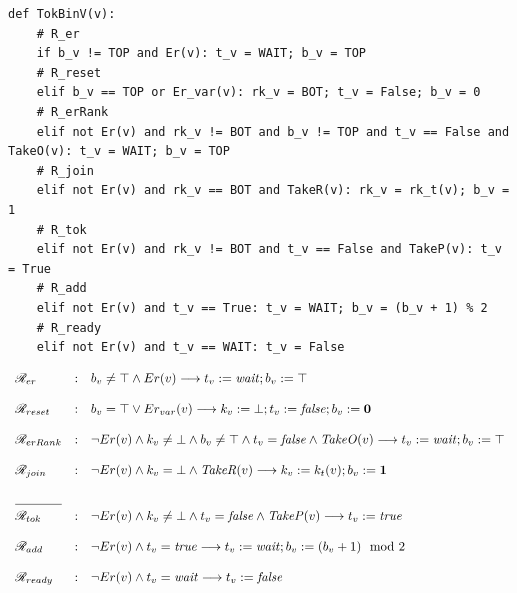 \documentclass[a4paper, 12pt]{article}
\newcommand{\bz}{\mathbf{0}}
\newcommand{\bo}{\mathbf{1}}
\newcommand{\rk}{k}
\begin{document}
\begin{lstlisting}[caption={\(\mathtt{TokBinV}\) (node \(v \neq r\))}, label={algo:TokBinV-py}]
def TokBinV(v):
    # R_er
    if b_v != TOP and Er(v): t_v = WAIT; b_v = TOP
    # R_reset
    elif b_v == TOP or Er_var(v): rk_v = BOT; t_v = False; b_v = 0
    # R_erRank
    elif not Er(v) and rk_v != BOT and b_v != TOP and t_v == False and TakeO(v): t_v = WAIT; b_v = TOP
    # R_join
    elif not Er(v) and rk_v == BOT and TakeR(v): rk_v = rk_t(v); b_v = 1
    # R_tok
    elif not Er(v) and rk_v != BOT and t_v == False and TakeP(v): t_v = True
    # R_add
    elif not Er(v) and t_v == True: t_v = WAIT; b_v = (b_v + 1) % 2
    # R_ready
    elif not Er(v) and t_v == WAIT: t_v = False
\end{lstlisting}

\begin{algorithm*}[!htbp]
\noindent
\[
\begin{array}{lcl}
\mathscr{R}_{er}&:&  b_v\neq\top \wedge Er(v)  \longrightarrow t_v:=\mathit{wait};b_v:=\top\\\\
\mathscr{R}_{reset}&:&   b_v=\top \vee Er_{var}(v) \longrightarrow  \rk_v:=\bot;t_v:=\mathit{false};b_v:=\bz\\\\
\mathscr{R}_{erRank}&:& \neg Er(v) \wedge \rk_v\neq\bot \wedge b_v\neq\top \wedge t_v=\mathit{false} \wedge  \mathit{TakeO}(v) \longrightarrow t_v:=\mathit{wait};b_v:=\top\\\\
\mathscr{R}_{join}&:& \neg Er(v) \wedge \rk_v=\bot \wedge  \mathit{TakeR}(v) \longrightarrow \rk_v:=\rk_t(v);b_v:=\bo \\\\
\hrulefill\\
\mathscr{R}_{tok}&:& \neg Er(v) \wedge \rk_v\neq\bot \wedge t_v=\mathit{false}  \wedge \mathit{TakeP}(v)   \longrightarrow t_v:=\mathit{true} \\\\
\mathscr{R}_{add}&:& \neg Er(v) \wedge t_v=\mathit{true} \longrightarrow t_v:=\mathit{wait};b_v:=(b_v+1)\mod 2  \\\\
\mathscr{R}_{ready}&:& \neg Er(v) \wedge t_v=\mathit{wait} \longrightarrow t_v:=\mathit{false} \\\\
\end{array}
\]
\caption{Algorithm $\mathtt{TokBinV}$ for Node~$v\in V \setminus \{r\}$}
\label{algo:TokBinV}
\end{algorithm*}
\end{document}
